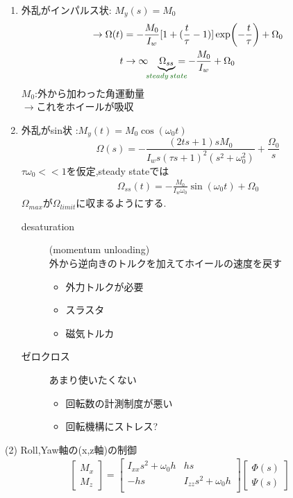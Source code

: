 \documentclass[class=article, crop=false, dvipdfmx]{standalone}
\begin{document}
\begin{enumerate}
\item 外乱がインパルス状: $M_y(s) = M_0$\\
\begin{align}
\rightarrow \Omega(t) &= -
\frac{M_0}{I_w}[1 + 
(\frac{t}{\tau} - 1)]\exp(-\frac{t}{\tau}) + \Omega_0\\
t&\rightarrow \infty \quad
\underexpl{\Omega_{ss}}{\textcolor{darkgreen}{steady\,state}} = -\frac{M_0}{I_w} + \Omega_0
\end{align}
$M_0$:外から加わった角運動量\\
$\rightarrow$これをホイールが吸収
\item 外乱がsin状 :$M_y(t) = M_0 \cos(\omega_0 t)$\\
\begin{equation}
\Omega(s) = -
\frac{(2ts + 1)sM_0}{I_ws(\tau s + 1)^2 (s^2 + \omega_0 ^2)} + \frac{\Omega_0}{s}
\end{equation}
$\tau \omega_0 <<1$を仮定,steady stateでは
\begin{align}
 \Omega_{ss}(t) = - \frac{M_0}
 {I_w \omega_0}
 \sin(\omega_0 t) + \Omega_0
\end{align}
$\Omega_{max}$が$\Omega_{limit}$に収まるようにする.



\begin{description}
\item [desaturation](momentum unloading)\\
外から逆向きのトルクを加えてホイールの速度を戻す
\begin{itemize}
\item 外力トルクが必要
\item スラスタ
\item 磁気トルカ
\end{itemize}
\item [ゼロクロス]あまり使いたくない
\begin{itemize}
\item 回転数の計測制度が悪い
\item 回転機構にストレス?
\end{itemize}
\end{description}
\end{enumerate}
(2) Roll,Yaw軸の(x,z軸)の制御\\
\begin{align}
 \begin{bmatrix}
   M_x\\
   M_z
 \end{bmatrix}
=
\begin{bmatrix}
  I_{xx} s^2 + \omega_0 h& hs\\
  -hs & I_{zz} s^2 + \omega_0 h\\
\end{bmatrix}
\begin{bmatrix}
  \Phi(s)\\
  \Psi(s)
\end{bmatrix}
\end{align}
\end{document}
